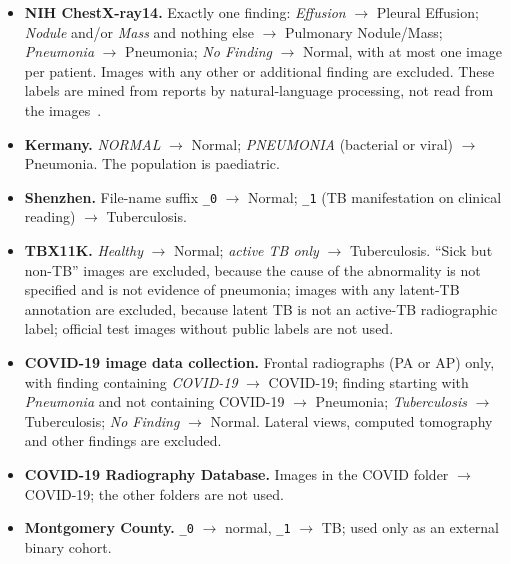 \begin{itemize}
\item \textbf{NIH ChestX-ray14.} Exactly one finding: \emph{Effusion} $\rightarrow$ Pleural Effusion; \emph{Nodule} and/or \emph{Mass} and nothing else $\rightarrow$ Pulmonary Nodule/Mass; \emph{Pneumonia} $\rightarrow$ Pneumonia; \emph{No Finding} $\rightarrow$ Normal, with at most one image per patient. Images with any other or additional finding are excluded. These labels are mined from reports by natural-language processing, not read from the images~\cite{wang2017chestxray8,oakdenrayner2020exploring}.
\item \textbf{Kermany.} \emph{NORMAL} $\rightarrow$ Normal; \emph{PNEUMONIA} (bacterial or viral) $\rightarrow$ Pneumonia. The population is paediatric.
\item \textbf{Shenzhen.} File-name suffix \texttt{\_0} $\rightarrow$ Normal; \texttt{\_1} (TB manifestation on clinical reading) $\rightarrow$ Tuberculosis.
\item \textbf{TBX11K.} \emph{Healthy} $\rightarrow$ Normal; \emph{active TB only} $\rightarrow$ Tuberculosis. ``Sick but non-TB'' images are excluded, because the cause of the abnormality is not specified and is not evidence of pneumonia; images with any latent-TB annotation are excluded, because latent TB is not an active-TB radiographic label; official test images without public labels are not used.
\item \textbf{COVID-19 image data collection.} Frontal radiographs (PA or AP) only, with finding containing \emph{COVID-19} $\rightarrow$ COVID-19; finding starting with \emph{Pneumonia} and not containing COVID-19 $\rightarrow$ Pneumonia; \emph{Tuberculosis} $\rightarrow$ Tuberculosis; \emph{No Finding} $\rightarrow$ Normal. Lateral views, computed tomography and other findings are excluded.
\item \textbf{COVID-19 Radiography Database.} Images in the COVID folder $\rightarrow$ COVID-19; the other folders are not used.
\item \textbf{Montgomery County.} \texttt{\_0} $\rightarrow$ normal, \texttt{\_1} $\rightarrow$ TB; used only as an external binary cohort.
\end{itemize}

